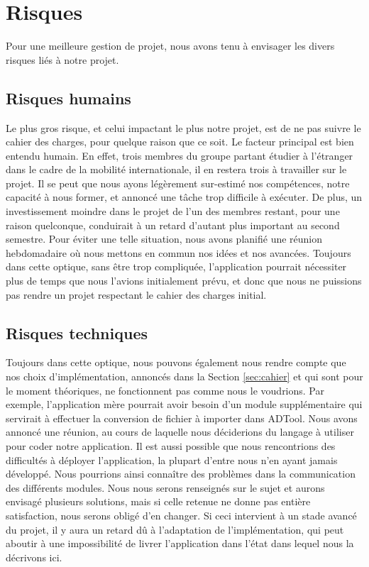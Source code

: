 \section{Risques}
    Pour une meilleure gestion de projet, nous avons tenu à envisager les divers risques liés à notre projet.

    \subsection{Risques humains}
		Le plus gros risque, et celui impactant le plus notre projet, est de ne pas suivre le cahier des charges, pour quelque raison que ce soit.
	    Le facteur principal est bien entendu humain. En effet, trois membres du groupe partant étudier à l'étranger dans le cadre de la mobilité internationale, il en restera trois à travailler sur le projet. Il se peut que nous ayons légèrement sur-estimé nos compétences, notre capacité à nous former, et annoncé une tâche trop difficile à exécuter. De plus, un investissement moindre dans le projet de l'un des membres restant, pour une raison quelconque, conduirait à un retard d'autant plus important au second semestre. Pour éviter une telle situation, nous avons planifié une réunion hebdomadaire où nous mettons en commun nos idées et nos avancées. Toujours dans cette optique, sans être trop compliquée, l'application pourrait nécessiter plus de temps que nous l'avions initialement prévu, et donc que nous ne puissions pas rendre un projet respectant le cahier des charges initial.

    \subsection{Risques techniques}
	    Toujours dans cette optique, nous pouvons également nous rendre compte que nos choix d'implémentation, annoncés dans la Section \ref{sec:cahier} et qui sont pour le moment théoriques, ne fonctionnent pas comme nous le voudrions. Par exemple, l'application mère pourrait avoir besoin d'un module supplémentaire qui servirait à effectuer la conversion de fichier à importer dans ADTool. Nous avons annoncé une réunion, au cours de laquelle nous déciderions du langage à utiliser pour coder notre application.
	    Il est aussi possible que nous rencontrions des difficultés à déployer l'application, la plupart d'entre nous n'en ayant jamais développé. Nous pourrions ainsi connaître des problèmes dans la communication des différents modules. Nous nous serons renseignés sur le sujet et aurons envisagé plusieurs solutions, mais si celle retenue ne donne pas entière satisfaction, nous serons obligé d'en changer. Si ceci intervient à un stade avancé du projet, il y aura un retard dû à l'adaptation de l'implémentation, qui peut aboutir à une impossibilité de livrer l'application dans l'état dans lequel nous la décrivons ici.

